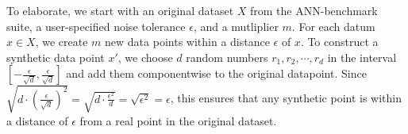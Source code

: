 To elaborate, we start with an original dataset $X$ from the ANN-benchmark suite, a user-specified noise tolerance $\epsilon$, and a mutliplier $m$.
For each datum $x \in X$, we create $m$ new data points within a distance $\epsilon$ of $x$. To construct a synthetic data point $x'$, we choose $d$ random numbers 
$r_1, r_2, \cdots , r_d$ in the interval $[-\tfrac{\epsilon}{\sqrt{d}}, \tfrac{\epsilon}{\sqrt{d}}]$ and add them componentwise to the original datapoint. 
Since $\sqrt{d \cdot (\tfrac{\epsilon}{\sqrt{d}})^2 } = \sqrt{d \cdot \tfrac{\epsilon^2}{d}}  = \sqrt{\epsilon^2} = \epsilon$, this ensures that any synthetic point is within a distance of $\epsilon$ from a real point in the original dataset.

